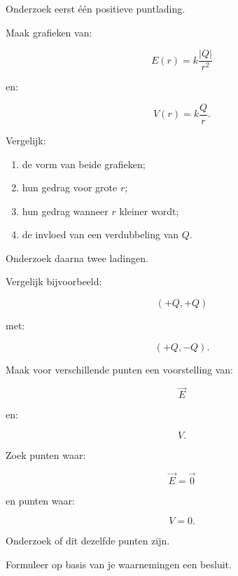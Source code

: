 \documentclass{ximera}
\begin{document}
Onderzoek eerst één positieve puntlading.

Maak grafieken van:

\[
E(r)=k\frac{|Q|}{r^2}
\]

en:

\[
V(r)=k\frac{Q}{r}.
\]

Vergelijk:

\begin{enumerate}
  \item de vorm van beide grafieken;
  \item hun gedrag voor grote $r$;
  \item hun gedrag wanneer $r$ kleiner wordt;
  \item de invloed van een verdubbeling van $Q$.
\end{enumerate}

Onderzoek daarna twee ladingen.

Vergelijk bijvoorbeeld:

\[
(+Q,+Q)
\]

met:

\[
(+Q,-Q).
\]

Maak voor verschillende punten een voorstelling van:

\[
\vec E
\]

en:

\[
V.
\]

Zoek punten waar:

\[
\vec E=\vec 0
\]

en punten waar:

\[
V=0.
\]

Onderzoek of dit dezelfde punten zijn.

Formuleer op basis van je waarnemingen een besluit.



\end{document}
